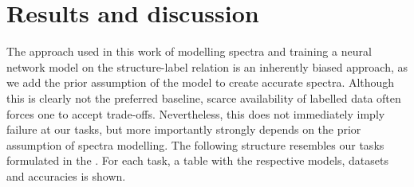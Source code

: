 

\chapter{Results and discussion} %
\label{Chapter4}
The approach used in this work of modelling spectra and training a neural network model on the structure-label relation is an inherently biased approach, as we add the prior assumption of the model to create accurate spectra. Although this is clearly not the preferred baseline, scarce availability of labelled data often forces one to accept trade-offs. Nevertheless, this does not immediately imply failure at our tasks, but more importantly strongly depends on the prior assumption of spectra modelling. The following structure resembles our tasks formulated in the . For each task, a table with the respective models, datasets and accuracies is shown.





